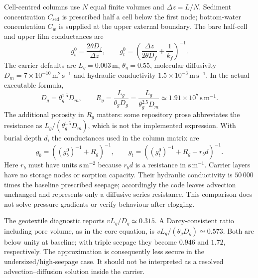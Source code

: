 Cell-centred columns use $N$ equal finite volumes and $\Delta z=L/N$. Sediment concentration $C_{\mathrm{sed}}$ is prescribed half a cell below the first node; bottom-water concentration $C_w$ is supplied at the upper external boundary. The bare half-cell and upper film conductances are
\begin{equation}
 g_b^0=\frac{2\theta D_f}{\Delta z},\qquad
 g_t^0=\left(\frac{\Delta z}{2\theta D_f}+\frac{1}{k_f}\right)^{-1}.
 \label{eq:conductances}
\end{equation}
The carrier defaults are $L_g=0.003\,\mathrm{m}$, $\theta_g=0.55$, molecular diffusivity $D_m=7\times10^{-10}\,\mathrm{m^2\,s^{-1}}$ and hydraulic conductivity $1.5\times10^{-3}\,\mathrm{m\,s^{-1}}$. In the actual executable formula,
\begin{equation}
 D_g=\theta_g^{1.5}D_m,\qquad
 R_g=\frac{L_g}{\theta_g D_g}
 =\frac{L_g}{\theta_g^{2.5}D_m}
 \simeq1.91\times10^7\,\mathrm{s\,m^{-1}}.
 \label{eq:textile_resistance}
\end{equation}
The additional porosity in $R_g$ matters: some repository prose abbreviates the resistance as $L_g/(\theta_g^{1.5}D_m)$, which is not the implemented expression. With burial depth $d$, the conductances used in the column matrix are
\begin{equation}
 g_b=\left((g_b^0)^{-1}+R_g\right)^{-1},\qquad
 g_t=\left((g_t^0)^{-1}+R_g+r_bd\right)^{-1}.
 \label{eq:encapsulated}
\end{equation}
Here $r_b$ must have units $\mathrm{s\,m^{-2}}$ because $r_bd$ is a resistance in $\mathrm{s\,m^{-1}}$. Carrier layers have no storage nodes or sorption capacity. Their hydraulic conductivity is $50\,000$ times the baseline prescribed seepage; accordingly the code leaves advection unchanged and represents only a diffusive series resistance. This comparison does not solve pressure gradients or verify behaviour after clogging.

The geotextile diagnostic reports $vL_g/D_g\simeq0.315$. A Darcy-consistent ratio including pore volume, as in the core equation, is $vL_g/(\theta_gD_g)\simeq0.573$. Both are below unity at baseline; with triple seepage they become $0.946$ and $1.72$, respectively. The approximation is consequently less secure in the undersized/high-seepage case. It should not be interpreted as a resolved advection--diffusion solution inside the carrier.


